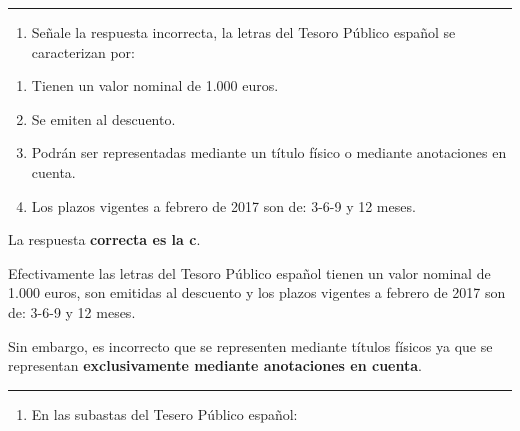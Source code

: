 \documentclass[
  letterpaper,
  DIV=11,
  numbers=noendperiod]{scrreprt}
\providecommand{\tightlist}{%
  \setlength{\itemsep}{0pt}\setlength{\parskip}{0pt}}\usepackage{longtable,booktabs,array}
\begin{document}
\begin{center}\rule{0.5\linewidth}{0.5pt}\end{center}

\begin{enumerate}
\def\labelenumi{\arabic{enumi}.}
\setcounter{enumi}{3}
\tightlist
\item
  Señale la respuesta incorrecta, la letras del Tesoro Público español
  se caracterizan por:
\end{enumerate}

\begin{enumerate}
\def\labelenumi{\alph{enumi}.}
\item
  Tienen un valor nominal de 1.000 euros.
\item
  Se emiten al descuento.
\item
  Podrán ser representadas mediante un título físico o mediante
  anotaciones en cuenta.
\item
  Los plazos vigentes a febrero de 2017 son de: 3-6-9 y 12 meses.
\end{enumerate}

\begin{tcolorbox}[enhanced jigsaw, left=2mm, opacityback=0, colback=white, breakable, arc=.35mm, bottomrule=.15mm, rightrule=.15mm, toprule=.15mm, leftrule=.75mm, colframe=quarto-callout-tip-color-frame]
\begin{minipage}[t]{5.5mm}
\textcolor{quarto-callout-tip-color}{\faLightbulb}
\end{minipage}%
\begin{minipage}[t]{\textwidth - 5.5mm}

La respuesta \textbf{correcta es la c}.

Efectivamente las letras del Tesoro Público español tienen un valor
nominal de 1.000 euros, son emitidas al descuento y los plazos vigentes
a febrero de 2017 son de: 3-6-9 y 12 meses.

Sin embargo, es incorrecto que se representen mediante títulos físicos
ya que se representan \textbf{exclusivamente mediante anotaciones en
cuenta}.

\end{minipage}%
\end{tcolorbox}

\begin{center}\rule{0.5\linewidth}{0.5pt}\end{center}

\begin{enumerate}
\def\labelenumi{\arabic{enumi}.}
\setcounter{enumi}{4}
\tightlist
\item
  En las subastas del Tesero Público español:
\end{enumerate}
\end{document}
